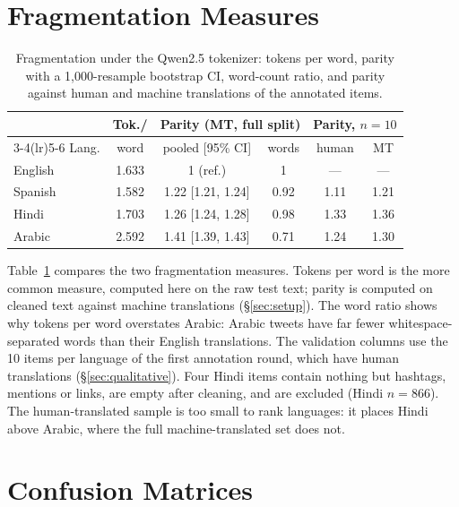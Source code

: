 \documentclass[11pt]{article}
\begin{document}
\section{Fragmentation Measures}
\label{app:parity}

\begin{table}[H]
\centering\small
\setlength{\tabcolsep}{3pt}
\begin{tabular}{@{}lccccc@{}}
\toprule
& Tok./ & \multicolumn{2}{c}{Parity (MT, full split)} & \multicolumn{2}{c}{Parity, $n{=}10$} \\
\cmidrule(lr){3-4}\cmidrule(lr){5-6}
Lang. & word & pooled [95\% CI] & words & human & MT \\
\midrule
English & 1.633 & 1 (ref.) & 1 & --- & --- \\
Spanish & 1.582 & 1.22 [1.21, 1.24] & 0.92 & 1.11 & 1.21 \\
Hindi   & 1.703 & 1.26 [1.24, 1.28] & 0.98 & 1.33 & 1.36 \\
Arabic  & 2.592 & 1.41 [1.39, 1.43] & 0.71 & 1.24 & 1.30 \\
\bottomrule
\end{tabular}
\caption{Fragmentation under the Qwen2.5 tokenizer: tokens per word, parity with a
1{,}000-resample bootstrap CI, word-count ratio, and parity against human and
machine translations of the annotated items.}
\label{tab:parity}
\end{table}


Table~\ref{tab:parity} compares the two fragmentation measures. Tokens per word is
the more common measure, computed here on the raw test text; parity is computed on cleaned text against machine translations
(\S\ref{sec:setup}). The word ratio shows why tokens per word overstates Arabic:
Arabic tweets have far fewer whitespace-separated words than their English
translations. The validation columns use the 10 items per language of the first
annotation round, which have human translations (\S\ref{sec:qualitative}). Four Hindi items contain nothing
but hashtags, mentions or links, are empty after cleaning, and are excluded
(Hindi $n{=}866$). The human-translated sample is too small to rank languages: it
places Hindi above Arabic, where the full machine-translated set does not.

\section{Confusion Matrices}
\label{app:confusion}
\end{document}
